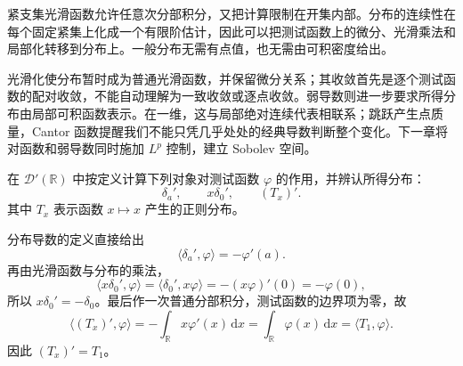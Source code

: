



\begin{chaptersummary}
紧支集光滑函数允许任意次分部积分，又把计算限制在开集内部。分布的连续性在每个固定紧集上化成一个有限阶估计，因此可以把测试函数上的微分、光滑乘法和局部化转移到分布上。一般分布无需有点值，也无需由可积密度给出。

\ProseParagraphBreak

光滑化使分布暂时成为普通光滑函数，并保留微分关系；其收敛首先是逐个测试函数的配对收敛，不能自动理解为一致收敛或逐点收敛。弱导数则进一步要求所得分布由局部可积函数表示。在一维，这与局部绝对连续代表相联系；跳跃产生点质量，Cantor 函数提醒我们不能只凭几乎处处的经典导数判断整个变化。下一章将对函数和弱导数同时施加 \(L^p\) 控制，建立 Sobolev 空间。
\end{chaptersummary}


\BookExercises


\begin{exercise}\label{b1:ex:20-basic-distribution-pairings}
在 \(\mathcal D'(\mathbb R)\) 中按定义计算下列对象对测试函数 \(\varphi\) 的作用，并辨认所得分布：
\[
 \delta_a',\qquad x\delta_0',\qquad (T_x)'.
\]
其中 \(T_x\) 表示函数 \(x\mapsto x\) 产生的正则分布。
\end{exercise}
\begin{solution}
分布导数的定义直接给出
\[
 \langle\delta_a',\varphi\rangle=-\varphi'(a).
\]
再由光滑函数与分布的乘法，
\[
 \langle x\delta_0',\varphi\rangle
 =\langle\delta_0',x\varphi\rangle
 =-(x\varphi)'(0)=-\varphi(0),
\]
所以 \(x\delta_0'=-\delta_0\)。最后作一次普通分部积分，测试函数的边界项为零，故
\[
 \langle(T_x)',\varphi\rangle
 =-\int_{\mathbb R}x\varphi'(x)\,\mathrm dx
 =\int_{\mathbb R}\varphi(x)\,\mathrm dx
 =\langle T_1,\varphi\rangle.
\]
因此 \((T_x)'=T_1\)。
\end{solution}


